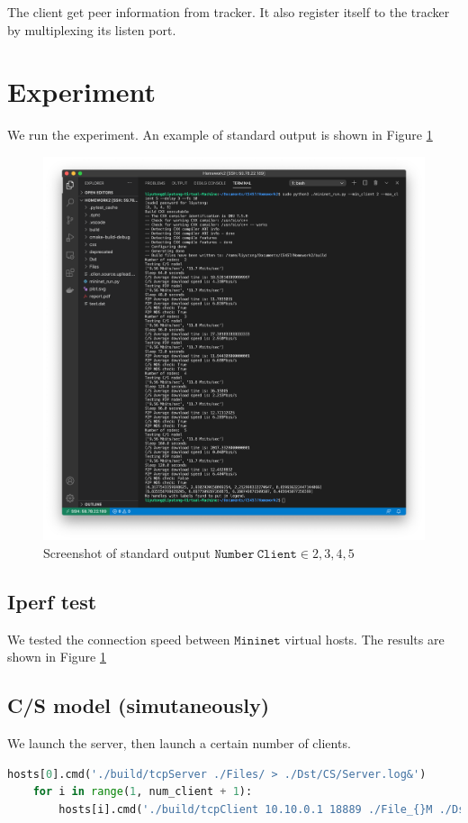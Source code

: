 The client get peer information from tracker. It also register itself to the tracker by multiplexing its listen port.
\section{Experiment}
We run the experiment. An example of standard output is shown in Figure \ref{screenshot}
\begin{figure}[H]
	\centering
	\includegraphics[scale=0.35]{img/run}
	\caption{Screenshot of standard output $\mathtt{Number \ Client} \in {2,3,4,5}$}
	\label{screenshot}
\end{figure}
\subsection{Iperf test}
We tested the connection speed between $\mathtt{Mininet}$ virtual hosts. The results are shown in Figure \ref{screenshot}


\subsection{C/S model (simutaneously)}
We launch the server, then launch a certain number of clients.

\begin{lstlisting}[language=python]
    hosts[0].cmd('./build/tcpServer ./Files/ > ./Dst/CS/Server.log&')
    for i in range(1, num_client + 1):
        hosts[i].cmd('./build/tcpClient 10.10.0.1 18889 ./File_{}M ./Dst/CS/Downloads/Client{}_File_{}M > ./Dst/CS/Client{}.log&'.format(file_size, i, file_size, i))
\end{lstlisting}

